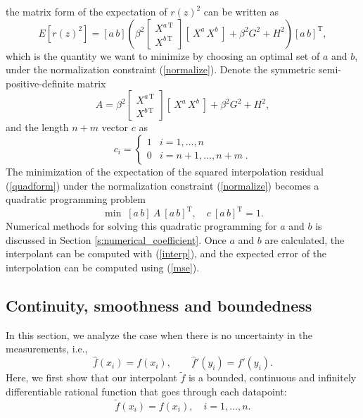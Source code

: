 the matrix form of the expectation of $r(z)^2$ can be written as
\begin{equation} \label{mse}
  E\left[r(z)^2\right] = [a\,b] \left( \beta^2
   \left[\begin{array}{c}X^{a\,\mathrm T}\\X^{b\,\mathrm T}\end{array}\right]
   \left[\: X^a\,X^b \:\right] + \beta^2 G^2 + H^2 \right) [a\,b]^{\mathrm T},
\end{equation}
which is the quantity we want to minimize by choosing an optimal set of $a$ and
$b$, under the normalization constraint (\ref{normalize}).  Denote the
symmetric semi-positive-definite matrix
\[ A = \beta^2
   \left[\begin{array}{c}X^{a\,\mathrm T}\\X^{b\,\mathrm T}\end{array}\right]
   \left[\: X^a\,X^b \:\right] + \beta^2 G^2 + H^2 ,\]
and the length $n+m$ vector $c$ as
\[ c_i = \begin{cases} 1 & i=1,\ldots,n\\ 0 & i=n+1,\ldots,n+m  \;.\end{cases}\]
The minimization of the expectation of the squared interpolation residual
(\ref{quadform}) under the normalization constraint (\ref{normalize})
becomes a quadratic programming problem
\begin{equation} \label{quadprog}
\min\; [a\,b]\: A\: [a\,b]^{\mathrm T}, \quad c\: [a\,b]^{\mathrm T} = 1.
\end{equation}
Numerical methods for solving this quadratic programming for $a$ and $b$ is
discussed in Section \ref{s:numerical_coefficient}.
Once $a$ and $b$ are calculated, the
interpolant can be computed with (\ref{interp}), and the expected error of the
interpolation can be computed using (\ref{mse}).



\subsection{Continuity, smoothness and boundedness}
In this section, we analyze the case when there is no uncertainty in the
measurements, i.e.,
\[ {\hat f}(x_i) = f(x_i), \qquad {\hat f}'(y_i) = f'(y_i). \]
Here, we first show that our interpolant ${\tilde f}$ is a bounded,
continuous and infinitely differentiable rational function that goes through
each datapoint:
\[ {\tilde f}(x_i) = f(x_i), \quad i = 1,\ldots,n . \]

